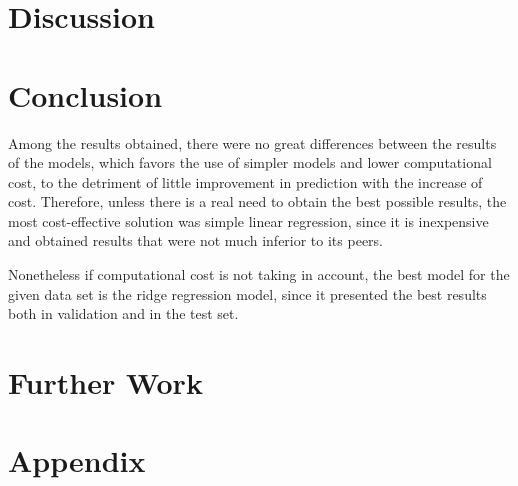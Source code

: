 \section{Discussion}


\section{Conclusion}
Among the results obtained, there were no great differences between the results of the models, which favors the use of simpler models and lower computational cost, to the detriment of little improvement in prediction with the increase of cost. Therefore, unless there is a real need to obtain the best possible results, the most cost-effective solution was simple linear regression, since it is inexpensive and obtained results that were not much inferior to its peers. 

Nonetheless if computational cost is not taking in account, the best model for the given data set is the ridge regression model, since it presented the best results both in validation and in the test set.



\section{Further Work}


\section*{Appendix}

